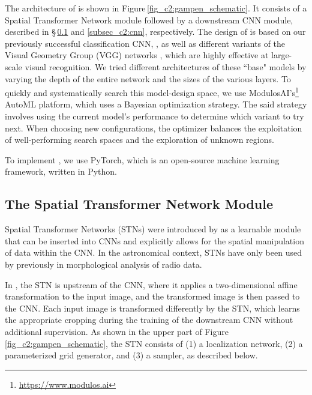 The architecture of \gampen{} is shown in Figure\,\ref{fig_c2:gampen_schematic}. It consists of a Spatial Transformer Network module followed by a downstream CNN module, described in \S\,\ref{subsec_c2:STN} and \ref{subsec_c2:cnn}, respectively. The design of \gampen{} is based on our previously successful classification CNN, \gamornet{} \citep{Ghosh2020GalaxyGalaxies}, as well as different variants of the Visual Geometry Group (VGG) networks \citep{vgg}, which are highly effective at large-scale visual recognition. We tried different architectures of these ``base" models by varying the depth of the entire network and the sizes of the various layers. To quickly and systematically search this model-design space, we use ModulosAI's\footnote{\href{https://www.modulos.ai}{https://www.modulos.ai}} AutoML platform, which uses a Bayesian optimization strategy. The said strategy involves using the current model's performance to determine which variant to try next. When choosing new configurations, the optimizer balances the exploitation of well-performing search spaces and the exploration of unknown regions.

To implement \gampen{}, we use PyTorch,
 which is an open-source machine learning framework, written in Python.

\subsection{The Spatial Transformer Network Module } \label{subsec_c2:STN}
Spatial Transformer Networks (STNs) were introduced by \cite{jarderberg_15} as a learnable module that can be inserted into CNNs and explicitly allows for the spatial manipulation of data within the CNN. In the astronomical context, STNs have only been used by \cite{wu_2019} previously in morphological analysis of radio data. 

In \gampen{}, the STN is upstream of the CNN, where it applies a two-dimensional affine transformation to the input image, and the transformed image is then passed to the CNN. 
Each input image is transformed differently by the STN, which 
learns the appropriate cropping during the training of the downstream CNN without additional supervision. As shown in the upper part of Figure \ref{fig_c2:gampen_schematic}, the STN consists of (1) a localization network, (2) a parameterized grid generator, and (3) a sampler, as described below.

